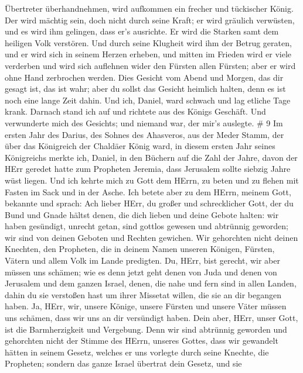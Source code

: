 Übertreter überhandnehmen, wird aufkommen ein frecher und tückischer
König.  Der wird mächtig sein, doch nicht durch seine
Kraft; er wird gräulich verwüsten, und es wird ihm gelingen, dass er's
ausrichte. Er wird die Starken samt dem heiligen Volk verstören.
 Und durch seine Klugheit wird ihm der Betrug geraten, und
er wird sich in seinem Herzen erheben, und mitten im Frieden wird er
viele verderben und wird sich auflehnen wider den Fürsten allen Fürsten;
aber er wird ohne Hand zerbrochen werden.  Dies Gesicht vom
Abend und Morgen, das dir gesagt ist, das ist wahr; aber du sollst das
Gesicht heimlich halten, denn es ist noch eine lange Zeit dahin.
 Und ich, Daniel, ward schwach und lag etliche Tage krank.
Darnach stand ich auf und richtete aus des Königs Geschäft. Und
verwunderte mich des Gesichts; und niemand war, der mir's auslegte. \# 9
 Im ersten Jahr des Darius, des Sohnes des Ahasveros, aus
der Meder Stamm, der über das Königreich der Chaldäer König ward,
 in diesem ersten Jahr seines Königreichs merkte ich,
Daniel, in den Büchern auf die Zahl der Jahre, davon der HErr geredet
hatte zum Propheten Jeremia, dass Jerusalem sollte siebzig Jahre wüst
liegen.  Und ich kehrte mich zu Gott dem HErrn, zu beten und
zu flehen mit Fasten im Sack und in der Asche.  Ich betete
aber zu dem HErrn, meinem Gott, bekannte und sprach: Ach lieber HErr, du
großer und schrecklicher Gott, der du Bund und Gnade hältst denen, die
dich lieben und deine Gebote halten:  wir haben gesündigt,
unrecht getan, sind gottlos gewesen und abtrünnig geworden; wir sind von
deinen Geboten und Rechten gewichen.  Wir gehorchten nicht
deinen Knechten, den Propheten, die in deinem Namen unseren Königen,
Fürsten, Vätern und allem Volk im Lande predigten.  Du,
HErr, bist gerecht, wir aber müssen uns schämen; wie es denn jetzt geht
denen von Juda und denen von Jerusalem und dem ganzen Israel, denen, die
nahe und fern sind in allen Landen, dahin du sie verstoßen hast um ihrer
Missetat willen, die sie an dir begangen haben.  Ja, HErr,
wir, unsere Könige, unsere Fürsten und unsere Väter müssen uns schämen,
dass wir uns an dir versündigt haben.  Dein aber, HErr,
unser Gott, ist die Barmherzigkeit und Vergebung. Denn wir sind
abtrünnig geworden  und gehorchten nicht der Stimme des
HErrn, unseres Gottes, dass wir gewandelt hätten in seinem Gesetz,
welches er uns vorlegte durch seine Knechte, die Propheten;
 sondern das ganze Israel übertrat dein Gesetz, und sie
